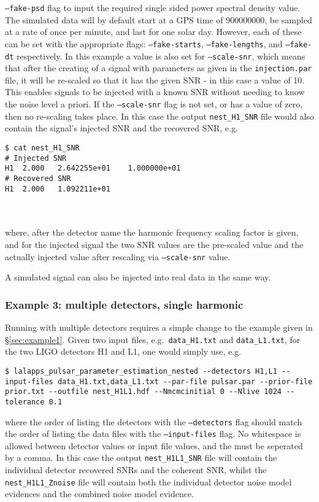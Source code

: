 {\tt --fake-psd} flag to input the required single sided
power spectral density value. The simulated data will by default start at a GPS time of 900000000, be sampled at a rate of once per minute, and last for
one solar day. However, each of these can be set with the appropriate flags: {\tt --fake-starts}, {\tt --fake-lengths}, and {\tt --fake-dt} respectively.
In this example a value is also set for {\tt --scale-snr}, which means that after the creating of a signal with parameters as given in the {\tt injection.par}
file, it will be re-scaled so that it has the given SNR - in this case a value of 10. This enables signals to be injected with a known SNR without needing to
know the noise level a priori. If the {\tt --scale-snr} flag is not set, or has a value of zero, then no re-scaling takes place. In this case the output
{\tt nest\_H1\_SNR} file would also contain the signal's injected SNR and the recovered SNR, e.g.\
\begin{lrbox}{\Lst}
\begin{lstlisting}
$ cat nest_H1_SNR
# Injected SNR
H1	2.000	2.642255e+01	1.000000e+01
# Recovered SNR
H1	2.000	1.092211e+01
\end{lstlisting}
\end{lrbox}
\\[5pt] \indent \fbox{\usebox{\Lst}} \\[5pt]
where, after the detector name the harmonic frequency scaling factor is given, and for the injected signal the two SNR values are the pre-scaled value
and the actually injected value after rescaling via {\tt --scale-snr} value.

A simulated signal can also be injected into real data in the same way.

\subsubsection{Example 3: multiple detectors, single harmonic}

Running with multiple detectors requires a simple change to the example given in \S\ref{sec:example1}. Given two input files, e.g.\ {\tt data\_H1.txt}
and {\tt data\_L1.txt}, for the two LIGO detectors H1 and L1, one would simply use, e.g.\
\begin{lstlisting}[frame=single]
$ lalapps_pulsar_parameter_estimation_nested --detectors H1,L1 --input-files data_H1.txt,data_L1.txt --par-file pulsar.par --prior-file prior.txt --outfile nest_H1L1.hdf --Nmcmcinitial 0 --Nlive 1024 --tolerance 0.1
\end{lstlisting}
where the order of listing the detectors with the {\tt --detectors} flag should match the order of listing the data files with the {\tt --input-files} flag.
No whitespace is allowed between detector values or input file values, and the must be seperated by a comma. In this case the output {\tt nest\_H1L1\_SNR} file
will contain the individual detector recovered SNRs and the coherent SNR, whilst the {\tt nest\_H1L1\_Znoise} file will contain both the individual detector
noise model evidences and the combined noise model evidence.

